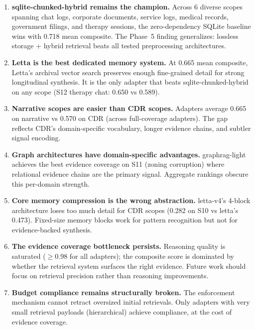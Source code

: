 \documentclass[11pt,letterpaper]{article}
\begin{document}
\begin{enumerate}
  \item \textbf{sqlite-chunked-hybrid remains the champion.} Across 6 diverse scopes spanning chat logs, corporate documents, service logs, medical records, government filings, and therapy sessions, the zero-dependency SQLite baseline wins with 0.718 mean composite. The Phase~5 finding generalizes: lossless storage + hybrid retrieval beats all tested preprocessing architectures.

  \item \textbf{Letta is the best dedicated memory system.} At 0.665 mean composite, Letta's archival vector search preserves enough fine-grained detail for strong longitudinal synthesis. It is the only adapter that beats sqlite-chunked-hybrid on any scope (S12 therapy chat: 0.650 vs 0.589).

  \item \textbf{Narrative scopes are easier than CDR scopes.} Adapters average 0.665 on narrative vs 0.570 on CDR (across full-coverage adapters). The gap reflects CDR's domain-specific vocabulary, longer evidence chains, and subtler signal encoding.

  \item \textbf{Graph architectures have domain-specific advantages.} graphrag-light achieves the best evidence coverage on S11 (zoning corruption) where relational evidence chains are the primary signal. Aggregate rankings obscure this per-domain strength.

  \item \textbf{Core memory compression is the wrong abstraction.} letta-v4's 4-block architecture loses too much detail for CDR scopes (0.282 on S10 vs letta's 0.473). Fixed-size memory blocks work for pattern recognition but not for evidence-backed synthesis.

  \item \textbf{The evidence coverage bottleneck persists.} Reasoning quality is saturated ($\geq$0.98 for all adapters); the composite score is dominated by whether the retrieval system surfaces the right evidence. Future work should focus on retrieval precision rather than reasoning improvements.

  \item \textbf{Budget compliance remains structurally broken.} The enforcement mechanism cannot retract oversized initial retrievals. Only adapters with very small retrieval payloads (hierarchical) achieve compliance, at the cost of evidence coverage.
\end{enumerate}
\end{document}
